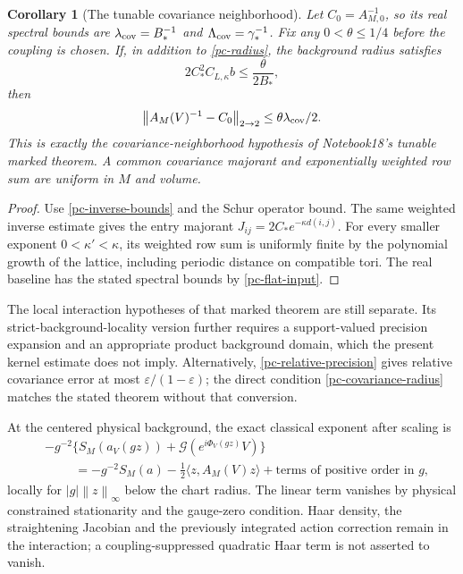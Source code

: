 \documentclass[11pt]{article}
\newtheorem{corollary}[theorem]{Corollary}
\newcommand{\norm}[1]{\left\|#1\right\|}
\begin{document}
\begin{corollary}[The tunable covariance neighborhood]
\label{pc-tunable-covariance}
Let $C_0=A_{M,0}^{-1}$, so its real spectral bounds are
$\lambda_{\rm cov}=B_*^{-1}$ and
$\Lambda_{\rm cov}=\gamma_*^{-1}$. Fix any
$0<\theta\le1/4$ before the coupling is chosen. If, in addition
to \eqref{pc-radius}, the background radius satisfies
\begin{equation}\label{pc-covariance-radius}
 2C_*^2C_{L,\kappa}b\le\frac{\theta}{2B_*},
\end{equation}
then
\begin{equation}\label{pc-covariance-close}
 \norm{A_M(V)^{-1}-C_0}_{2\to2}
       \le\theta\lambda_{\rm cov}/2.
\end{equation}
This is exactly the covariance-neighborhood hypothesis of
Notebook18's tunable marked theorem. A common covariance
majorant and exponentially weighted row sum are uniform in
$M$ and volume.
\end{corollary}
\begin{proof}
Use \eqref{pc-inverse-bounds} and the Schur operator bound.
The same weighted inverse estimate gives the entry majorant
$J_{ij}=2C_*e^{-\kappa d(i,j)}$. For every smaller exponent
$0<\kappa'<\kappa$, its weighted row sum is uniformly finite
by the polynomial growth of the lattice, including periodic
distance on compatible tori. The real baseline has the stated
spectral bounds by \eqref{pc-flat-input}.
\end{proof}
The local interaction hypotheses of that marked theorem are
still separate. Its strict-background-locality version further
requires a support-valued precision expansion and an appropriate
product background domain, which the present kernel estimate
does not imply. Alternatively,
\eqref{pc-relative-precision} gives relative covariance error
at most $\varepsilon/(1-\varepsilon)$; the direct condition
\eqref{pc-covariance-radius} matches the stated theorem without
that conversion.

At the centered physical background, the exact classical
exponent after scaling is
\begin{equation}\label{pc-scaled-exponent}
 \begin{split}
 &-g^{-2}\{S_M(a_V(gz))+\mathcal G(e^{i\Phi_V(gz)}V)\}\\
 &\hspace{1cm}=-g^{-2}S_M(a)-\tfrac12\langle z,A_M(V)z\rangle
                  +\text{terms of positive order in }g,
 \end{split}
\end{equation}
locally for $|g|\norm z_\infty$ below the chart radius. The
linear term vanishes by physical constrained stationarity and
the gauge-zero condition. Haar density, the straightening
Jacobian and the previously integrated action correction
remain in the interaction; a coupling-suppressed quadratic
Haar term is not asserted to vanish.
\end{document}
